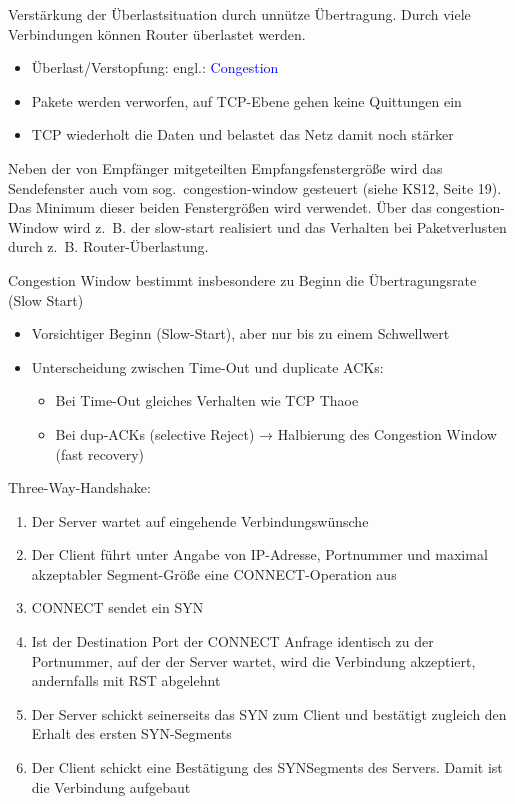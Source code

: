 Verstärkung der Überlastsituation durch unnütze Übertragung.
Durch viele Verbindungen können Router überlastet werden.
\begin{itemize}
    \item Überlast/Verstopfung: engl.: \textcolor{blue}{Congestion}
    \item Pakete werden verworfen, auf TCP-Ebene gehen keine Quittungen ein
    \item TCP wiederholt die Daten und belastet das Netz damit noch stärker
\end{itemize}

Neben der von Empfänger mitgeteilten Empfangsfenstergröße wird das Sendefenster auch vom sog.\ congestion-window gesteuert (siehe KS12, Seite 19).
Das Minimum dieser beiden Fenstergrößen wird verwendet.
Über das congestion-Window wird z.\ B. der slow-start realisiert und das Verhalten bei Paketverlusten durch z.\ B. Router-Überlastung.

Congestion Window bestimmt insbesondere zu Beginn die Übertragungsrate (Slow Start)

\begin{itemize}
    \item Vorsichtiger Beginn (Slow-Start), aber nur bis zu einem Schwellwert
    \item Unterscheidung zwischen Time-Out und duplicate ACKs:
    \begin{itemize}
        \item Bei Time-Out gleiches Verhalten wie TCP Thaoe
        \item Bei dup-ACKs (selective Reject) → Halbierung des Congestion Window (fast recovery)
    \end{itemize}
\end{itemize}

Three-Way-Handshake:
\begin{enumerate}
    \item Der Server wartet auf eingehende Verbindungswünsche
    \item Der Client führt unter Angabe von IP-Adresse, Portnummer und maximal akzeptabler Segment-Größe eine CONNECT-Operation aus
    \item CONNECT sendet ein SYN
    \item Ist der Destination Port der CONNECT Anfrage identisch zu der Portnummer, auf der der Server wartet, wird die Verbindung akzeptiert, andernfalls mit RST abgelehnt
    \item Der Server schickt seinerseits das SYN zum Client und bestätigt zugleich den Erhalt des ersten SYN-Segments
    \item Der Client schickt eine Bestätigung des SYNSegments des Servers.
    Damit ist die Verbindung aufgebaut
\end{enumerate}

